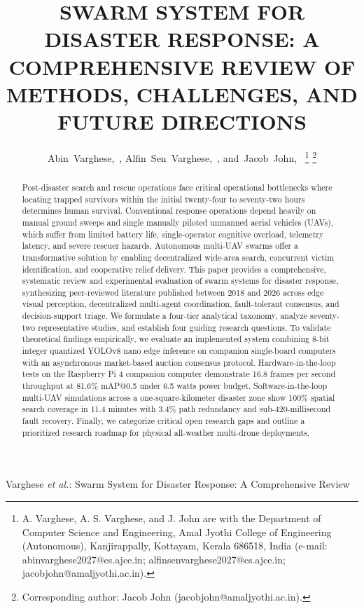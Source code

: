\documentclass[journal]{IEEEtran}
\begin{document}
\title{SWARM SYSTEM FOR DISASTER RESPONSE: A COMPREHENSIVE REVIEW OF METHODS, CHALLENGES, AND FUTURE DIRECTIONS}

\author{Abin~Varghese,~,
        Alfin~Sen~Varghese,~,
        and~Jacob~John,~%
\thanks{A. Varghese, A. S. Varghese, and J. John are with the Department of Computer Science and Engineering, Amal Jyothi College of Engineering (Autonomous), Kanjirappally, Kottayam, Kerala 686518, India (e-mail: abinvarghese2027@cs.ajce.in; alfinsenvarghese2027@cs.ajce.in; jacobjohn@amaljyothi.ac.in).}%
\thanks{Corresponding author: Jacob John (jacobjohn@amaljyothi.ac.in).}}

%
{Varghese \MakeLowercase{\textit{et al.}}: Swarm System for Disaster Response: A Comprehensive Review}

\maketitle

\begin{abstract}
Post-disaster search and rescue operations face critical operational bottlenecks where locating trapped survivors within the initial twenty-four to seventy-two hours determines human survival. Conventional response operations depend heavily on manual ground sweeps and single manually piloted unmanned aerial vehicles (UAVs), which suffer from limited battery life, single-operator cognitive overload, telemetry latency, and severe rescuer hazards. Autonomous multi-UAV swarms offer a transformative solution by enabling decentralized wide-area search, concurrent victim identification, and cooperative relief delivery. This paper provides a comprehensive, systematic review and experimental evaluation of swarm systems for disaster response, synthesizing peer-reviewed literature published between 2018 and 2026 across edge visual perception, decentralized multi-agent coordination, fault-tolerant consensus, and decision-support triage. We formulate a four-tier analytical taxonomy, analyze seventy-two representative studies, and establish four guiding research questions. To validate theoretical findings empirically, we evaluate an implemented system combining 8-bit integer quantized YOLOv8 nano edge inference on companion single-board computers with an asynchronous market-based auction consensus protocol. Hardware-in-the-loop tests on the Raspberry Pi 4 companion computer demonstrate 16.8 frames per second throughput at 81.6\% mAP@0.5 under 6.5 watts power budget. Software-in-the-loop multi-UAV simulations across a one-square-kilometer disaster zone show 100\% spatial search coverage in 11.4 minutes with 3.4\% path redundancy and sub-420-millisecond fault recovery. Finally, we categorize critical open research gaps and outline a prioritized research roadmap for physical all-weather multi-drone deployments.
\end{abstract}
\end{document}
